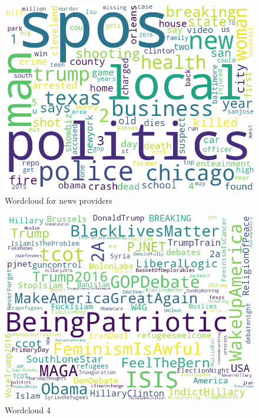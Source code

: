 \documentclass[12pt, authoryear]{elsarticle}
\begin{document}
\begin{figure}[H]
\includegraphics[width=5in]{wordcloud3}
\centering
\caption{Wordcloud for news providers}
\label{wordcloud:3}
\end{figure}


\begin{figure}[H]
\includegraphics[width=5in]{wordcloud4}
\centering
\caption{Wordcloud 4}
\label{wordcloud:4}
\end{figure}
\end{document}

